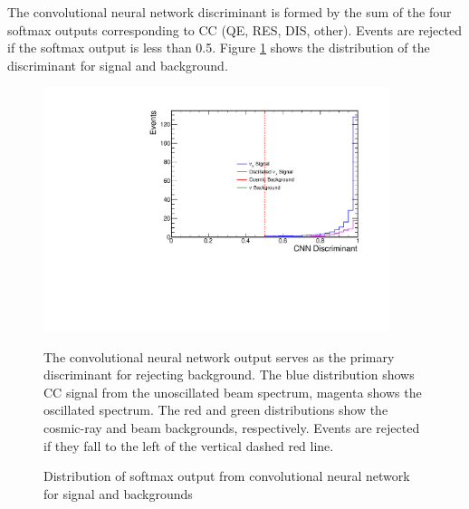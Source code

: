 The convolutional neural network discriminant is formed by the sum of the four
softmax outputs corresponding to \numu CC (QE, RES, DIS, other).
Events are rejected if the softmax output is less than 0.5.
Figure \ref{cvnnumu} shows the distribution of the discriminant for
signal and background.



\begin{figure}[t]
\begin{center}
\includegraphics[width=0.9\textwidth]{figures/selection/n1_cvnnumu.pdf}
\end{center}
\caption{Distribution of softmax output from convolutional neural network for signal and backgrounds}{
The convolutional neural network output serves as the primary discriminant for
rejecting background.
The blue distribution shows \numu CC signal from the unoscillated beam spectrum,
magenta shows the oscillated spectrum.
The red and green distributions show the cosmic-ray and beam backgrounds,
respectively.  Events are rejected if they fall to the left of the vertical
dashed red line.
}
\label{cvnnumu}
\end{figure}


